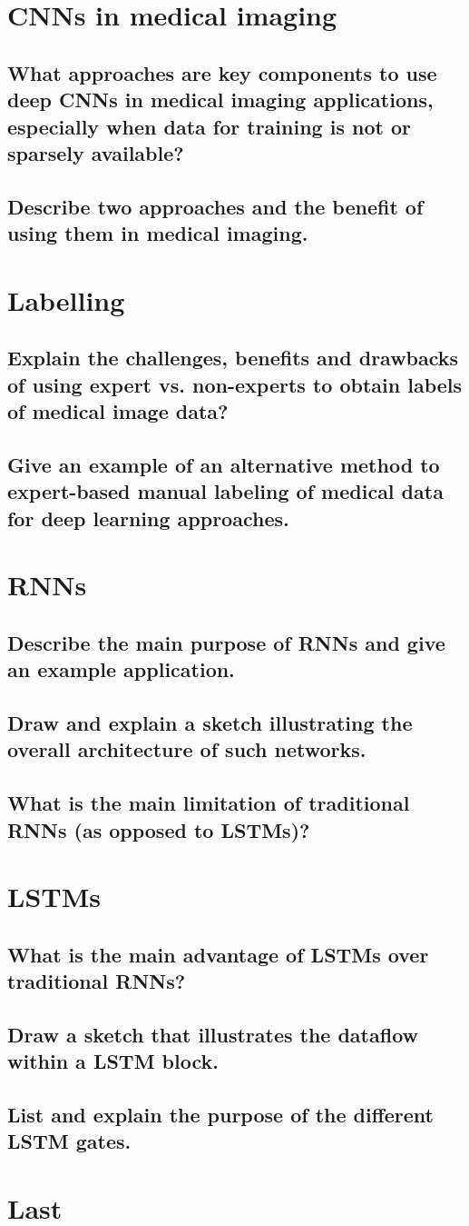 \section{CNNs in medical imaging}
\subsection{What approaches are key components to use deep CNNs in medical imaging applications, especially when data for training is not or sparsely available?}
\subsection{Describe two approaches and the benefit of using them in medical imaging.}

\section{Labelling}
\subsection{Explain the challenges, benefits and drawbacks of using expert vs. non-experts to obtain labels of medical image data?}
\subsection{Give  an example of an alternative method to expert-based manual labeling of medical data for deep learning approaches.}

\section{RNNs}
\subsection{Describe the main purpose of RNNs and give an example application.}
\subsection{Draw and explain a sketch illustrating the overall  architecture of such networks.}
\subsection{What is the main limitation of traditional RNNs (as opposed to LSTMs)?}

\section{LSTMs}
\subsection{What is the main advantage of LSTMs over traditional RNNs?}
\subsection{Draw a sketch that illustrates the dataflow within a LSTM block.}
\subsection{List and explain the purpose of the different LSTM gates.}

\section{Last}\label{sec:ref}
